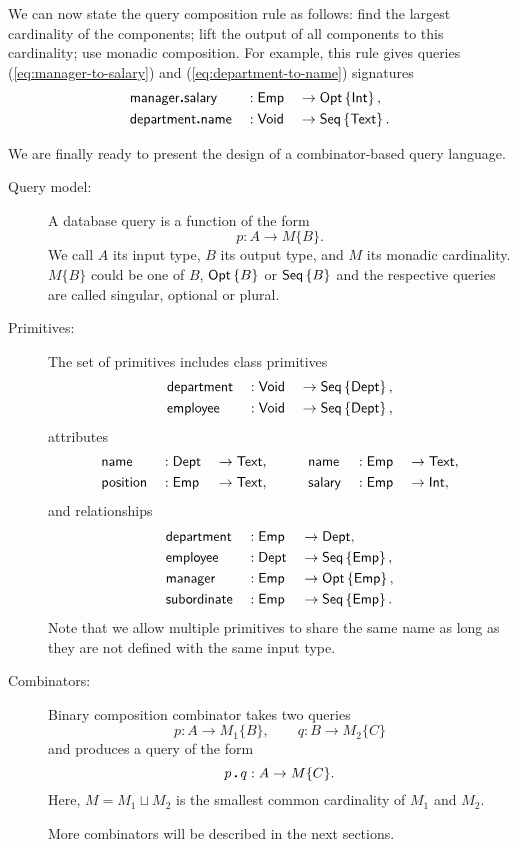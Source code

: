 We can now state the query composition rule as follows: find the largest
cardinality of the components; lift the output of all components to this
cardinality; use monadic composition.  For example, this rule gives queries
(\ref{eq:manager-to-salary}) and (\ref{eq:department-to-name}) signatures
\begin{alignat*}{3}
    & \textup{\textsf{manager}}\boldsymbol{.}\textup{\textsf{salary}} && : \textup{\textsf{Emp}} && \to \textup{\textsf{Opt}}\left\{\textup{\textsf{Int}}\right\}, \\
    & \textup{\textsf{department}}\boldsymbol{.}\textup{\textsf{name}} && : \textup{\textsf{Void}} && \to \textup{\textsf{Seq}}\left\{\textup{\textsf{Text}}\right\}.
\end{alignat*}

We are finally ready to present the design of a combina\-tor-based query
language.

\begin{description}
\item[Query model:]
A database query is a function of the form
\begin{equation*}
    p : A \to M\{B\}.
\end{equation*}
We call $A$ its input type, $B$ its output type, and $M$ its monadic
cardinality.  $M\{B\}$ could be one of $B$, $\textup{\textsf{Opt}}\left\{B\right\}$ or $\textup{\textsf{Seq}}\left\{B\right\}$ and
the respective queries are called singular, optional or plural.

\item[Primitives:]
The set of primitives includes class primitives
\begin{alignat*}{3}
    & \textup{\textsf{department}} && : \textup{\textsf{Void}} && \to \textup{\textsf{Seq}}\left\{\textup{\textsf{Dept}}\right\}, \\
    & \textup{\textsf{employee}} && : \textup{\textsf{Void}} && \to \textup{\textsf{Seq}}\left\{\textup{\textsf{Dept}}\right\},
\end{alignat*}
attributes
\begin{alignat*}{6}
    & \textup{\textsf{name}} && : \textup{\textsf{Dept}} && \to \textup{\textsf{Text}}, \qquad
    && \textup{\textsf{name}} && : \textup{\textsf{Emp}} && \to \textup{\textsf{Text}}, \\
    & \textup{\textsf{position}} && : \textup{\textsf{Emp}} && \to \textup{\textsf{Text}}, \qquad
    && \textup{\textsf{salary}} && : \textup{\textsf{Emp}} && \to \textup{\textsf{Int}},
\end{alignat*}
and relationships
\begin{alignat*}{3}
    & \textup{\textsf{department}} && : \textup{\textsf{Emp}} && \to \textup{\textsf{Dept}}, \\
    & \textup{\textsf{employee}} && : \textup{\textsf{Dept}} && \to \textup{\textsf{Seq}}\left\{\textup{\textsf{Emp}}\right\}, \\
    & \textup{\textsf{manager}} && : \textup{\textsf{Emp}} && \to \textup{\textsf{Opt}}\left\{\textup{\textsf{Emp}}\right\}, \\
    & \textup{\textsf{subordinate}} && : \textup{\textsf{Emp}} && \to \textup{\textsf{Seq}}\left\{\textup{\textsf{Emp}}\right\}.
\end{alignat*}
Note that we allow multiple primitives to share the same name as long as they
are not defined with the same input type.

\item[Combinators:]
Binary composition combinator takes two queries
\begin{equation*}
    p : A \to M_1\{B\}, \qquad
    q : B \to M_2\{C\}
\end{equation*}
and produces a query of the form
\begin{equation*}
    p\,\boldsymbol{.}\,q : A \to M\{C\}.
\end{equation*}
Here, $M = M_1 \sqcup M_2$ is the smallest common cardinality of $M_1$ and
$M_2$.

More combinators will be described in the next sections.
\end{description}

